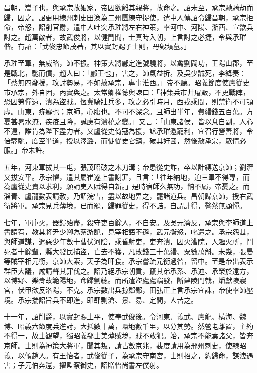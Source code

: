 \begin{pinyinscope}
 昌朝，嵩子也，與承宗故姻家，帝因欲離其親將，故命之。詔未至，承宗馳騎劫而歸，囚之。詔更用棣州刺史田渙為二州團練守捉使，遣中人傳詔令歸昌朝，承宗拒命，帝怒，詔削官爵，遣中人吐突承璀將左右神策，率河中、河陽、浙西、宣歙兵討之。趙萬敵者，故武俊將，以健鬥聞，士真時入朝，上言討之必捷，令與承璀偕。有詔：「武俊忠節茂著，其以實封賜子士則，毋毀墳墓。」



 承璀至軍，無威略，師不振。神策大將酈定進號驍將，以禽劉闢功，王陽山郡，至是戰北，馳而僨，趙人曰：「酈王也」，害之，師氣益折。及吳少誠死，李絳奏：「蔡無四鄰援，攻討勢易，不如赦承宗，專事淮西。」帝不聽。昭義節度使盧從史市承宗，外自固，內實與之。太常卿權德輿諫曰：「神策兵市井屠販，不更戰陣，恐因勞憚遠，潰為盜賊。恆冀騎壯兵多，攻之必引時月，西戎乘間，則禁衛不可頓虛。山東，疥癬也；京師，心腹也。不可不深念。且師出半年，費緡錢五百萬。方夏甚暑水潦，疾疫且降，誠慮有潰橈之變。」又言：「山東諸侯，皆以息自副，人心不遠，誰肯為陛下盡力者。又盧從史倚寇為援，訹承璀邀寵利，宜召行營善將，令倍驛馳，度至半道，授以澤潞，而徙從史它鎮，破其奸圖，然後赦承宗，眾情必服。」帝未許。



 五年，河東軍拔其一屯，張茂昭破之木刀溝；帝患從史詐，卒以計縛送京師；劉濟又拔安平。承宗懼，遣其屬崔遂上書謝罪，且言：「往年納地，迫三軍不得專，而為盧從史賣以求利，願請吏入賦得自新。」是時宿師久無功，餉不屬，帝憂之。而淄青、盧龍數表請赦，乃詔浣雪，盡以故地畀之，罷諸道兵。昌朝歸京師，授右武衛將軍。承宗見兵薄境，已而罷，歸罪從史，得不詰，自謂計得，謷然無顧憚。



 七年，軍庫火，器鎧殆盡，殺守吏百餘人，不自安。及吳元濟反，承宗與李師道上書請宥，教其將尹少卿為蔡游說，見宰相語不遜，武元衡怒，叱遣之。承宗怨甚，與師道謀，遣惡少年數十曹伏河陰，乘昏射吏，吏奔潰，因火漕院，人趣火所，鬥死者十餘輩，縣大發民捕盜，亡去不獲，凡敗錢三十萬緡、粟數萬斛。未幾，張晏等賊宰相元衡，京師大索，天子為旰食。承宗嘗疏元衡過咎，留中。至是帝出表示群臣大議，咸請聲其罪伐之。詔乃絕承宗朝貢，竄其弟承系、承迪、承榮於遠方，以博野、樂壽故範陽地，命歸劉總。而所遣盜處處竊發，斷建陵門戟，燔獻陵寢宮，伏甲欲反洛陽，不克。承宗數出兵掠鄰鄙，田弘正上言承宗宜誅，帝使率師壓境。承宗揣詔旨兵不即進，即肆剽滄、景、易、定間，人苦之。



 十一年，詔削爵，以實封賜土平，使奉武俊後。令河東、義武、盧龍、橫海、魏博、昭義六節度兵進討，大抵數十萬，環地數千里，以分其勢。然營屯離置，主約不得一，故士觀望，獨昭義郗士美薄賊境，賊不敢犯。始，承宗不能葉諸父，皆奔京師。士則為神策大將軍，聞其叛，請占數京兆，裴度請用為邢州刺史，使隸昭義，以傾趙人。有王怡者，武俊從子，為承宗守南宮，士則招之，約歸命，謀洩遇害；子元伯奔還，擢監察御史，詔贈怡尚書左僕射。




\end{pinyinscope}
